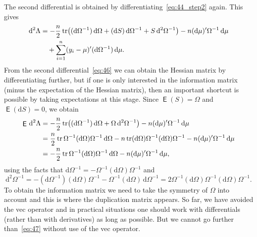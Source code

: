 \documentclass[12pt,a4paper]{article}
\theoremstyle{definition}
\DeclareMathOperator\expc{\mathsf{E}}
\DeclareMathOperator{\tr}{tr}
\newcommand{\dd}{\mathrm{d}}
\begin{document}
The second differential is obtained by differentiating~\eqref{eq:44_step2} again. This gives
\begin{align}\label{eq:46}
\dd^2\Lambda &= -\frac{n}{2}\tr\bigl((\dd\Omega^{-1})\, \dd\Omega + (\dd S)\, \dd\Omega^{-1} + S\, \dd^2\Omega^{-1}\bigr) - n(\dd\mu)'\Omega^{-1}\, \dd\mu \notag \\
&\quad + \sum_{i=1}^{n}(y_i - \mu)'(\dd\Omega^{-1})\, \dd\mu.
\end{align}
From the second differential~\eqref{eq:46} we can obtain the Hessian matrix by differentiating further, but if one is only interested in the information matrix (minus the expectation of the Hessian matrix), then an important shortcut is possible by taking expectations at this stage. Since $\expc(S) = \Omega$ and $\expc(\dd S) = 0$, we obtain
\begin{align}\label{eq:47}
\expc\, \dd^2\Lambda &= -\frac{n}{2}\tr\bigl((\dd\Omega^{-1})\, \dd\Omega + \Omega\, \dd^2\Omega^{-1}\bigr) - n(\dd\mu)'\Omega^{-1}\, \dd\mu \notag \\
&= \frac{n}{2}\tr\Omega^{-1}(\dd\Omega)\Omega^{-1}\, \dd\Omega - n\tr(\dd\Omega)\Omega^{-1}(\dd\Omega)\Omega^{-1} - n(\dd\mu)'\Omega^{-1}\, \dd\mu \notag \\
&= -\frac{n}{2}\tr\Omega^{-1}(\dd\Omega)\Omega^{-1}\, \dd\Omega - n(\dd\mu)'\Omega^{-1}\, \dd\mu,
\end{align}
using the facts that $\dd\Omega^{-1} = -\Omega^{-1}(\dd\Omega)\Omega^{-1}$ and
\[
\dd^2\Omega^{-1} = -(\dd\Omega^{-1})(\dd\Omega)\Omega^{-1} - \Omega^{-1}(\dd\Omega)\, \dd\Omega^{-1}
= 2\Omega^{-1}(\dd\Omega)\Omega^{-1}(\dd\Omega)\Omega^{-1}.
\]
To obtain the information matrix we need to take the symmetry of $\Omega$ into account and this is where the duplication matrix appears. So far, we have avoided the vec operator and in practical situations one should work with differentials (rather than with derivatives) as long as possible. But we cannot go further than~\eqref{eq:47} without use of the vec operator. %
\end{document}
